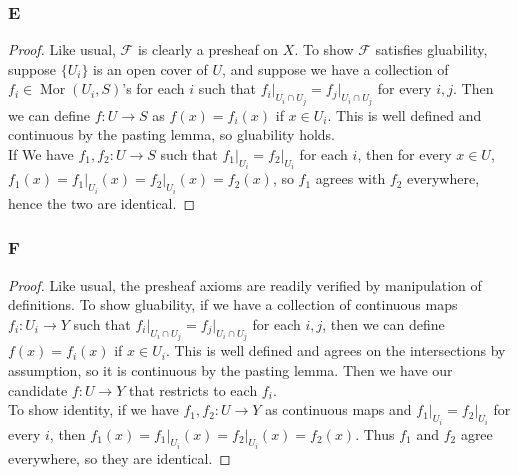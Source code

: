 \documentclass{article}
\newcommand{\fF}{\mathscr{F}}
\DeclareMathOperator{\Mor}{Mor}
\begin{document}
\subsubsection{E}\label{2.2.E}
\begin{proof}
    Like usual, $\fF$ is clearly a presheaf on $X$. To show $\fF$ satisfies gluability, suppose $\{U_i\}$ is an open cover of $U$, and suppose we have a collection of $f_i\in \Mor(U_i,S)$'s for each $i$ such that $f_i\vert_{U_i\cap U_j}=f_j\vert_{U_i\cap U_j}$ for every $i,j$. Then we can define $f:U\to S$ as $f(x)=f_i(x)$ if $x\in U_i$. This is well defined and continuous by the pasting lemma, so gluability holds.\\
    If We have $f_1,f_2:U\to S$ such that $f_1\vert_{U_i}=f_2\vert_{U_i}$ for each $i$, then for every $x\in U$, $f_1(x)=f_1\vert_{U_i}(x)=f_2\vert_{U_i}(x)=f_2(x)$, so $f_1$ agrees with $f_2$ everywhere, hence the two are identical.
\end{proof}
\subsubsection{F}\label{2.2.F}
\begin{proof}
    Like usual, the presheaf axioms are readily verified by manipulation of definitions. To show gluability, if we have a collection of continuous maps $f_i:U_i\to Y$ such that $f_i\vert_{U_i\cap U_j}=f_j\vert_{U_i\cap U_j}$ for each $i,j$, then we can define $f(x)=f_i(x)$ if $x\in U_i$. This is well defined and agrees on the intersections by assumption, so it is continuous by the pasting lemma. Then we have our candidate $f:U\to Y$ that restricts to each $f_i$.\\
    To show identity, if we have $f_1,f_2:U\to Y$ as continuous maps and $f_1\vert_{U_i}=f_2\vert_{U_i}$ for every $i$, then $f_1(x)=f_1\vert_{U_i}(x)=f_2\vert_{U_i}(x)=f_2(x)$. Thus $f_1$ and $f_2$ agree everywhere, so they are identical.
\end{proof}
\end{document}
